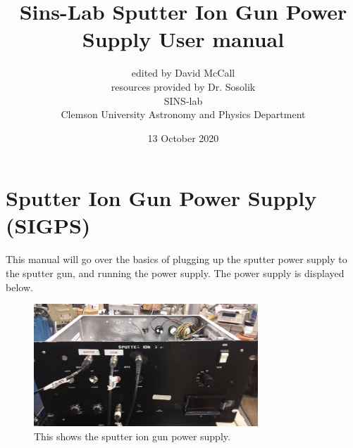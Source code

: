 \documentclass[11pt,a4paper]{report}
\begin{document}
\title{Sins-Lab Sputter Ion Gun Power Supply User manual}
\date{13 October 2020}
\author{edited by David McCall \\ resources provided by Dr. Sosolik \\ SINS-lab \\ Clemson University Astronomy and Physics Department}
\maketitle
\clearpage

\tableofcontents


\newpage

\pagestyle{fancy}
\lhead{\today} 

\chapter{Sputter Ion Gun Power Supply (SIGPS)}
This manual will go over the basics of plugging up the sputter power supply to the sputter gun, and running the power supply. The power supply is displayed below.

\begin{figure}[H]
\includegraphics[width=0.75\textwidth]{SIGPS.png}
\caption{This shows the sputter ion gun power supply. }
\label{SIGPSa}
\end{figure}

\end{document}
